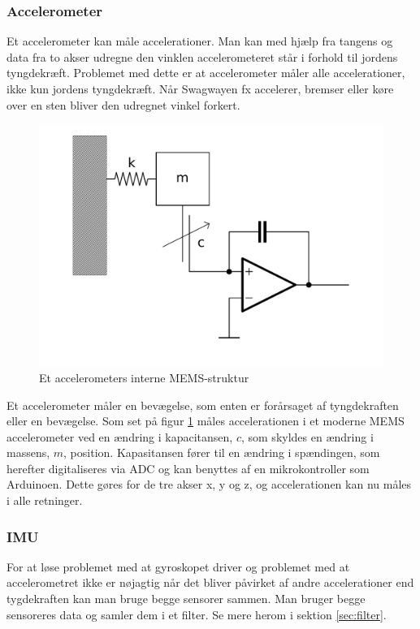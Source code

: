 \documentclass[a4paper,oneside,article,danish,table]{memoir}
\begin{document}
\subsubsection{Accelerometer}
Et accelerometer kan måle accelerationer. Man kan med hjælp fra tangens og data fra to akser udregne den vinklen accelerometeret står i forhold til jordens tyngdekræft. Problemet med dette er at accelerometer måler alle accelerationer, ikke kun jordens tyngdekræft. Når Swagwayen fx accelerer, bremser eller køre over en sten bliver den udregnet vinkel forkert.
\begin{figure}[htbp]
  \centering
  \includegraphics[width=\textwidth]{pictures/accbasic.pdf}
  \caption{Et accelerometers interne MEMS-struktur}
  \label{fig:memsacc}
\end{figure}
Et accelerometer måler en bevægelse, som enten er forårsaget af tyngdekraften eller en bevægelse. Som set på figur \ref{fig:memsacc} måles accelerationen i et moderne MEMS accelerometer ved en ændring i kapacitansen, $c$, som skyldes en ændring i massens, $m$, position. Kapasitansen fører til en ændring i spændingen, som herefter digitaliseres via ADC og kan benyttes af en mikrokontroller som Arduinoen. Dette gøres for de tre akser x, y og z, og accelerationen kan nu måles i alle retninger.

\subsubsection{IMU}
For at løse problemet med at gyroskopet driver og problemet med at accelerometret ikke er nøjagtig når det bliver påvirket af andre accelerationer end tygdekraften kan man bruge begge sensorer sammen. Man bruger begge sensoreres data og samler dem i et filter. Se mere herom i sektion \ref{sec:filter}.
\end{document}
